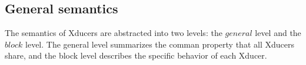 %
%
%
%
%
%
%

\subsection{General semantics}
The semantics of Xducers are abstracted into two levels: the $general$ level and the $block$ level. The general level summarizes the comman property that all Xducers share, and the block level describes the specific behavior of each Xducer. 

